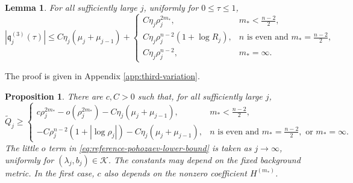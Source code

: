 \documentclass[11pt]{article}
\numberwithin{equation}{section}
\newtheorem{proposition}[theorem]{Proposition}
\newtheorem{lemma}[theorem]{Lemma}
\theoremstyle{remark}
\begin{document}
\begin{lemma}\label{lem:reference-third-variation}
For all sufficiently large \(j\), uniformly for \(0\le\tau\le1\),
\begin{equation}\label{eq:reference-third-variation}
 |\mathfrak q_j^{(3)}(\tau)|
 \le C\eta_j(\mu_j+\mu_{j-1})
 +\begin{cases}
  C\eta_j\rho_j^{2m_*},&m_*<\frac{n-2}{2},\\
  C\eta_j\rho_j^{n-2}(1+\log R_j),
  &n\text{ is even and }m_*=\frac{n-2}{2},\\
  C\eta_j\rho_j^{n-2},&m_*=\infty.
\end{cases}
\end{equation}
\end{lemma}

The proof is given in Appendix  \ref{app:third-variation}.

\begin{proposition}\label{prop:reference-pohozaev-lower-bound}
There are \(c,C>0\) such that, for all sufficiently large \(j\),
\begin{equation}\label{eq:reference-pohozaev-lower-bound}
 \widetilde Q_j\ge
 \begin{cases}
  c\rho_j^{2m_*}-o(\rho_j^{2m_*})
  -C\eta_j(\mu_j+\mu_{j-1}),&m_*<\frac{n-2}{2},\\
  -C\rho_j^{n-2}(1+|\log\rho_j|)
  -C\eta_j(\mu_j+\mu_{j-1}),
  &n\text{ is even and }m_*=\frac{n-2}{2},\text{ or }m_*=\infty.
 \end{cases}
\end{equation}
The little \(o\) term in \eqref{eq:reference-pohozaev-lower-bound} is taken
as \(j\to\infty\), uniformly for
\((\lambda_j,b_j)\in\mathcal K\).
{The constants may depend on the fixed background metric. In the
first case, \(c\) also depends on the nonzero coefficient
\(H^{(m_*)}\).}
\end{proposition}
\end{document}

